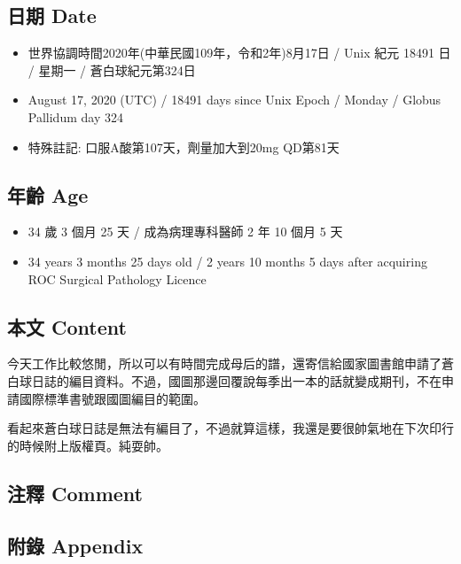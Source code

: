 \documentclass[
]{article}
\providecommand{\tightlist}{%
  \setlength{\itemsep}{0pt}\setlength{\parskip}{0pt}}
\begin{document}
\hypertarget{ux65e5ux671f-date-16}{%
\subsection{日期 Date}\label{ux65e5ux671f-date-16}}

\begin{itemize}
\tightlist
\item
  世界協調時間2020年(中華民國109年，令和2年)8月17日 / Unix 紀元 18491 日
  / 星期一 / 蒼白球紀元第324日
\item
  August 17, 2020 (UTC) / 18491 days since Unix Epoch / Monday / Globus
  Pallidum day 324
\item
  特殊註記: 口服A酸第107天，劑量加大到20mg QD第81天
\end{itemize}

\hypertarget{ux5e74ux9f61-age-16}{%
\subsection{年齡 Age}\label{ux5e74ux9f61-age-16}}

\begin{itemize}
\tightlist
\item
  34 歲 3 個月 25 天 / 成為病理專科醫師 2 年 10 個月 5 天
\item
  34 years 3 months 25 days old / 2 years 10 months 5 days after
  acquiring ROC Surgical Pathology Licence
\end{itemize}

\hypertarget{ux672cux6587-content-16}{%
\subsection{本文 Content}\label{ux672cux6587-content-16}}

今天工作比較悠閒，所以可以有時間完成母后的譜，還寄信給國家圖書館申請了蒼白球日誌的編目資料。不過，國圖那邊回覆說每季出一本的話就變成期刊，不在申請國際標準書號跟國圖編目的範圍。

看起來蒼白球日誌是無法有編目了，不過就算這樣，我還是要很帥氣地在下次印行的時候附上版權頁。純耍帥。

\hypertarget{ux6ce8ux91cb-comment-16}{%
\subsection{注釋 Comment}\label{ux6ce8ux91cb-comment-16}}

\hypertarget{ux9644ux9304-appendix-16}{%
\subsection{附錄 Appendix}\label{ux9644ux9304-appendix-16}}
\end{document}
